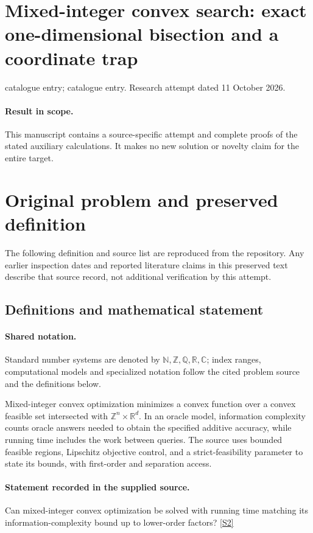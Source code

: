\documentclass[11pt]{article}
\begin{document}
\section*{Mixed-integer convex search: exact one-dimensional bisection and a coordinate trap}
\noindent catalogue entry; catalogue entry. Research attempt dated 11 October 2026.
\paragraph{Result in scope.}This manuscript contains a source-specific attempt and complete proofs of the stated auxiliary calculations. It makes no new solution or novelty claim for the entire target.
\section{Original problem and preserved definition}
The following definition and source list are reproduced from the repository. Any earlier inspection dates and reported literature claims in this preserved text describe that source record, not additional verification by this attempt.
\subsection{Definitions and mathematical statement}

\paragraph{Shared notation.}Standard number systems are denoted by $\mathbb N,\mathbb Z,\mathbb Q,\mathbb R,\mathbb C$; index ranges, computational models and specialized notation follow the cited problem source and the definitions below.


Mixed-integer convex optimization minimizes a convex function over a convex feasible set intersected with $\mathbb Z^n\times\mathbb R^d$. In an oracle model, information complexity counts oracle answers needed to obtain the specified additive accuracy, while running time includes the work between queries. The source uses bounded feasible regions, Lipschitz objective control, and a strict-feasibility parameter to state its bounds, with first-order and separation access.
\paragraph{Statement recorded in the supplied source.}
Can mixed-integer convex optimization be solved with running time matching its information-complexity bound up to lower-order factors? \href{https://doi.org/10.4171/owr/2021/53}{[S2]}
\end{document}
